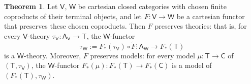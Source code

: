 \documentclass{amsart}
\theoremstyle{definition}
\newtheorem{theorem}{Theorem}
\newtheorem{lemma}[theorem]{Lemma}
\newcommand{\NN}{\mathsf{N}}
\newcommand{\A}{\mathsf{A}}
\newcommand{\V}{\mathsf{V}}
\newcommand{\W}{\mathsf{W}}
\newcommand{\D}{\mathsf{D}}
\newcommand{\C}{\mathsf{C}}
\newcommand{\T}{\mathsf{T}}
\newcommand{\maps}{\colon}
\begin{document}

\begin{theorem}
\label{thm:change-of-base}
Let $\V$, $\W$ be cartesian closed categories with chosen finite coproducts of their terminal objects, and let $F\maps \V \to \W$ be a cartesian functor that preserves these chosen coproducts.  Then $F$ preserves theories: that is, for every $\V$-theory $\tau_\V\maps \A_\V\to \T$, the $\W$-functor 
\[ \tau_\W := F_*(\tau_\V) \circ \tilde{F} \maps \A_\W \to F_*(\T)\]
is a $\W$-theory. Moreover, $F$ preserves models: for every model $\mu \maps\T \to \C$
of $(\T,\tau_\V) $, the $\W$-functor $F_*(\mu) \maps F_*(\T) \to F_*(\C)$ is a model of 
$(F_*(\T), \tau_\W)$.
\end{theorem}
\end{document}
